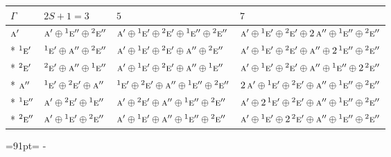 \documentclass[10pt,a4paper]{article}
\newcommand{\needspace}[1]{\par\penalty-100\begingroup\dimen0=#1\relax\dimen2=\pagegoal
  \advance\dimen2-\pagetotal\ifdim\dimen0>\dimen2\relax\ifdim\dimen2>0pt\vfil\break\fi\fi
  \endgroup}
\numberwithin{equation}{section}
\newcommand{\irr}[1]{\text{\normalfont\scshape #1}}
\newcommand{\conjpair}[1]{{}^{#1}}
\begin{document}
{\small\setlength{\tabcolsep}{3pt}\begin{longtable}{@{}llll@{}}\toprule
$\Gamma$ & $2S + 1 = 3$ & $5$ & $7$\\\midrule\endhead
\bottomrule\endfoot\endlastfoot
$\irr{a}'$ & $\irr{a}'\oplus \conjpair{1}\irr{e}''\oplus \conjpair{2}\irr{e}''$ & $\irr{a}'\oplus \conjpair{1}\irr{e}'\oplus \conjpair{2}\irr{e}'\oplus \conjpair{1}\irr{e}''\oplus \conjpair{2}\irr{e}''$ & $\irr{a}'\oplus \conjpair{1}\irr{e}'\oplus \conjpair{2}\irr{e}'\oplus 2\,\irr{a}''\oplus \conjpair{1}\irr{e}''\oplus \conjpair{2}\irr{e}''$\\*
$\conjpair{1}\irr{e}'$ & $\conjpair{1}\irr{e}'\oplus \irr{a}''\oplus \conjpair{2}\irr{e}''$ & $\irr{a}'\oplus \conjpair{1}\irr{e}'\oplus \conjpair{2}\irr{e}'\oplus \irr{a}''\oplus \conjpair{2}\irr{e}''$ & $\irr{a}'\oplus \conjpair{1}\irr{e}'\oplus \conjpair{2}\irr{e}'\oplus \irr{a}''\oplus 2\,\conjpair{1}\irr{e}''\oplus \conjpair{2}\irr{e}''$\\*
$\conjpair{2}\irr{e}'$ & $\conjpair{2}\irr{e}'\oplus \irr{a}''\oplus \conjpair{1}\irr{e}''$ & $\irr{a}'\oplus \conjpair{1}\irr{e}'\oplus \conjpair{2}\irr{e}'\oplus \irr{a}''\oplus \conjpair{1}\irr{e}''$ & $\irr{a}'\oplus \conjpair{1}\irr{e}'\oplus \conjpair{2}\irr{e}'\oplus \irr{a}''\oplus \conjpair{1}\irr{e}''\oplus 2\,\conjpair{2}\irr{e}''$\\*
$\irr{a}''$ & $\conjpair{1}\irr{e}'\oplus \conjpair{2}\irr{e}'\oplus \irr{a}''$ & $\conjpair{1}\irr{e}'\oplus \conjpair{2}\irr{e}'\oplus \irr{a}''\oplus \conjpair{1}\irr{e}''\oplus \conjpair{2}\irr{e}''$ & $2\,\irr{a}'\oplus \conjpair{1}\irr{e}'\oplus \conjpair{2}\irr{e}'\oplus \irr{a}''\oplus \conjpair{1}\irr{e}''\oplus \conjpair{2}\irr{e}''$\\*
$\conjpair{1}\irr{e}''$ & $\irr{a}'\oplus \conjpair{2}\irr{e}'\oplus \conjpair{1}\irr{e}''$ & $\irr{a}'\oplus \conjpair{2}\irr{e}'\oplus \irr{a}''\oplus \conjpair{1}\irr{e}''\oplus \conjpair{2}\irr{e}''$ & $\irr{a}'\oplus 2\,\conjpair{1}\irr{e}'\oplus \conjpair{2}\irr{e}'\oplus \irr{a}''\oplus \conjpair{1}\irr{e}''\oplus \conjpair{2}\irr{e}''$\\*
$\conjpair{2}\irr{e}''$ & $\irr{a}'\oplus \conjpair{1}\irr{e}'\oplus \conjpair{2}\irr{e}''$ & $\irr{a}'\oplus \conjpair{1}\irr{e}'\oplus \irr{a}''\oplus \conjpair{1}\irr{e}''\oplus \conjpair{2}\irr{e}''$ & $\irr{a}'\oplus \conjpair{1}\irr{e}'\oplus 2\,\conjpair{2}\irr{e}'\oplus \irr{a}''\oplus \conjpair{1}\irr{e}''\oplus \conjpair{2}\irr{e}''$\\
\bottomrule\end{longtable}}
\needspace{91pt}
\end{document}
